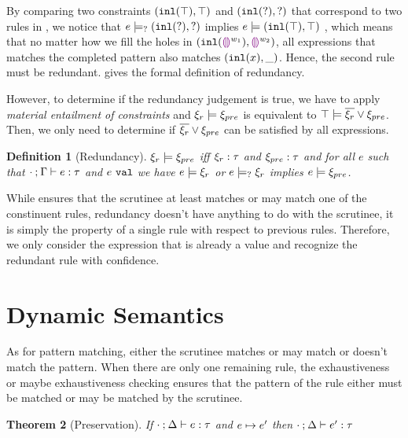 \documentclass[acmsmall,screen,review,nonacm]{acmart}
\theoremstyle{slplain}
\newtheorem{thm}{Theorem}  %
\numberwithin{thm}{section}
\newtheorem{defn}[thm]{Definition}
\begin{document}
By comparing two constraints $(\mathtt{inl}(\top) , \top)$ and $(\mathtt{inl}(\mathtt{?}) , \mathtt{?})$ that correspond to two rules in , we notice that
$e \models_{?} (\mathtt{inl}(\mathtt{?}) , \mathtt{?})$ implies $e \models (\mathtt{inl}(\top) , \top)$
, which means that no matter how we fill the holes in $(\mathtt{inl}(\textcolor{violet}{\llparenthesis}\textcolor{violet}{\rrparenthesis}^{w_1}) , \textcolor{violet}{\llparenthesis}\textcolor{violet}{\rrparenthesis}^{w_2})$, all expressions that matches the completed pattern also matches $(\mathtt{inl}(x) , \_)$. Hence, the second rule must be redundant.
 gives the formal definition of redundancy.

However, to determine if the redundancy judgement is true, we have to apply \emph{material entailment of constraints} and $\xi_r \models \xi_{pre}$ is equivalent to $\top \models \overline{\xi_r} \vee \xi_{pre}$. Then, we only need to determine if $\overline{\xi_r} \vee \xi_{pre}$ can be satisfied by all expressions.

\begin{defn}[Redundancy]
  \label{defn:redundancy}
  $\xi_r \models \xi_{pre}$ iff $\xi_r : \tau$ and $\xi_{pre} : \tau$ and for all $e$ such that $\cdot \mathbin{;} \Gamma \vdash e : \tau$ and $e ~\mathtt{val}$ we have $e \models \xi_r$ or $e \models_{?} \xi_r$ implies $e \models \xi_{pre}$.
\end{defn}

While  ensures that the scrutinee at least matches or may match one of the constinuent rules, redundancy doesn't have anything to do with the scrutinee, it is simply the property of a single rule with respect to previous rules. Therefore, we only consider the expression that is already a value and recognize the redundant rule with confidence.

\section{Dynamic Semantics}
\label{sec:dynamics}

As for pattern matching, either the scrutinee matches or may match or doesn't match the pattern.
When there are only one remaining rule, the exhaustiveness or maybe exhaustiveness checking ensures that the pattern of the rule either must be matched or may be matched by the scrutinee.

\begin{thm}[Preservation]
  \label{thrm:preservation}
  If $\cdot \mathbin{;} \Delta \vdash e : \tau$ and $e \mapsto e'$
  then $\cdot \mathbin{;} \Delta \vdash e' : \tau$
\end{thm}
\end{document}
